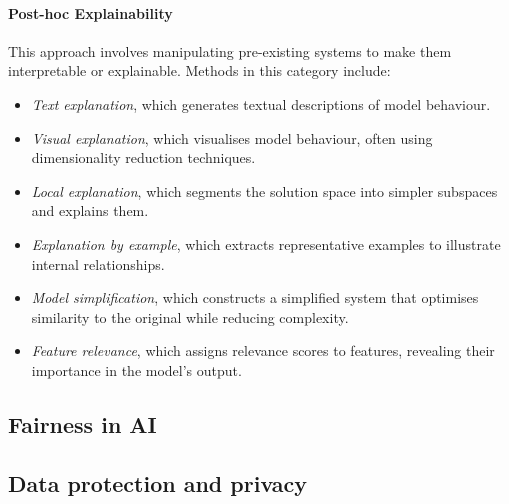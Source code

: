 \paragraph{Post-hoc Explainability}
%
This approach involves manipulating pre-existing systems to make them interpretable or explainable.
%
Methods in this category include:
%
\begin{itemize}
    \item \emph{Text explanation}, which generates textual descriptions of model behaviour.
    \item \emph{Visual explanation}, which visualises model behaviour, often using dimensionality reduction techniques.
    \item \emph{Local explanation}, which segments the solution space into simpler subspaces and explains them.
    \item \emph{Explanation by example}, which extracts representative examples to illustrate internal relationships.
    \item \emph{Model simplification}, which constructs a simplified system that optimises similarity to the original while reducing complexity.
    \item \emph{Feature relevance}, which assigns relevance scores to features, revealing their importance in the model's output.
\end{itemize}


\subsection[Fairness in AI]{Fairness in \gls{AI}}
\label{subsec:fairness-in-ai}



\subsection{Data protection and privacy}
\label{subsec:data-protection-and-privacy}


